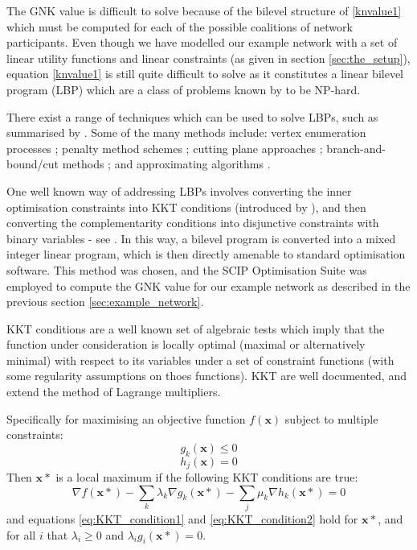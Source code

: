 The GNK value is difficult to solve because of the bilevel structure of \eqref{knvalue1} which must be computed for each of the possible coalitions of network participants.
Even though we have modelled our example network with a set of linear utility functions and linear constraints (as given in section \ref{sec:the_setup}), equation \eqref{knvalue1} is still quite difficult to solve as it constitutes a linear bilevel program (LBP) which are a class of problems known by to be NP-hard. \citep{DBLP:journals/tec/SinhaMD18,Ben-Ayed:1990:CDB} 

There exist a range of techniques which can be used to solve LBPs, such as summarised by \cite{DBLP:journals/tec/SinhaMD18,S.Dempe.Optimisations}.
Some of the many methods include: vertex enumeration processes \citep{Bialas:1984:TLP:2784019.2784026,Shi:2005:EKA:2641854.2642183,LIU1995644}; penalty method schemes \citep{KleinertSchmidt2019,ONAL1993126,dempe_optimisation111};
cutting plane approaches \citep{cuttingplane1};
branch-and-bound/cut methods \citep{SHI200551,Hansen:1992:NBR:141164.141181,Audet2007};
and approximating algorithms \citep{Pineda2018,rnnlbp1,genetic_algirthm_blp}.

One well known way of addressing LBPs involves converting the inner optimisation constraints into KKT conditions (introduced by \cite{kuhn1951nonlinear}), and then converting the complementarity conditions into disjunctive constraints with binary variables - see \cite{Fortuny-Amat1981,Pineda2018}.
In this way, a bilevel program is converted into a mixed integer linear program, which is then directly amenable to standard optimisation software.
This method was chosen, and the SCIP Optimisation Suite was employed to compute the GNK value for our example network as described in the previous section \ref{sec:example_network}.

KKT conditions are a well known set of algebraic tests which imply that the function under consideration is locally optimal (maximal or alternatively minimal) with respect to its variables under a set of constraint functions (with some regularity assumptions on thoes functions).
KKT are well documented, and extend the method of Lagrange multipliers.

Specifically for maximising an objective function $f(\mathbf{x})$ subject to multiple constraints:
\begin{equation}\label{eq:KKT_condition1} g_k(\mathbf{x})\le 0 \end{equation}
\begin{equation}\label{eq:KKT_condition2} h_j(\mathbf{x})=0 \end{equation}
Then $\mathbf{x}*$ is a local maximum if the following KKT conditions are true:
\begin{equation}\label{eq:KKT_conditions3} \nabla f(\mathbf{x}*) - \sum_k\lambda_k\nabla g_k(\mathbf{x}*) - \sum_j\mu_k\nabla h_k(\mathbf{x}*) =0\end{equation}
and equations \ref{eq:KKT_condition1} and \ref{eq:KKT_condition2} hold for $\mathbf{x}*$, and for all $i$ that $\lambda_i\ge 0$ and $\lambda_ig_i(\mathbf{x}*)=0$.

